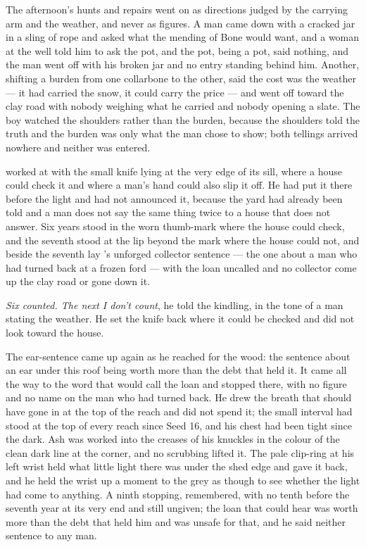 The afternoon's hunts and repairs went on as directions judged by the carrying arm and the weather, and never as figures. A man came down with a cracked jar in a sling of rope and asked what the mending of Bone would want, and a woman at the well told him to ask the pot, and the pot, being a pot, said nothing, and the man went off with his broken jar and no entry standing behind him. Another, shifting a burden from one collarbone to the other, said the cost was the weather --- it had carried the snow, it could carry the price --- and went off toward the clay road with nobody weighing what he carried and nobody opening a slate. The boy watched the shoulders rather than the burden, because the shoulders told the truth and the burden was only what the man chose to show; both tellings arrived nowhere and neither was entered.

\scenebreak

 worked at  with the small knife lying at the very edge of its sill, where a house could check it and where a man's hand could also slip it off. He had put it there before the light and had not announced it, because the yard had already been told and a man does not say the same thing twice to a house that does not answer. Six years stood in the worn thumb-mark where the house could check, and the seventh stood at the lip beyond the mark where the house could not, and beside the seventh lay 's unforged collector sentence --- the one about a man who had turned back at a frozen ford --- with the loan uncalled and no collector come up the clay road or gone down it.

\emph{Six counted. The next I don't count}, he told the kindling, in the tone of a man stating the weather. He set the knife back where it could be checked and did not look toward the house.

The ear-sentence came up again as he reached for the wood: the sentence about an ear under this roof being worth more than the debt that held it. It came all the way to the word that would call the loan and stopped there, with no figure and no name on the man who had turned back. He drew the breath that should have gone in at the top of the reach and did not spend it; the small interval had stood at the top of every reach since Seed 16, and his chest had been tight since the dark. Ash was worked into the creases of his knuckles in the colour of the clean dark line at the corner, and no scrubbing lifted it. The pale clip-ring at his left wrist held what little light there was under the shed edge and gave it back, and he held the wrist up a moment to the grey as though to see whether the light had come to anything. A ninth stopping, remembered, with no tenth before the seventh year at its very end and still ungiven; the loan that could hear was worth more than the debt that held him and was unsafe for that, and he said neither sentence to any man.

